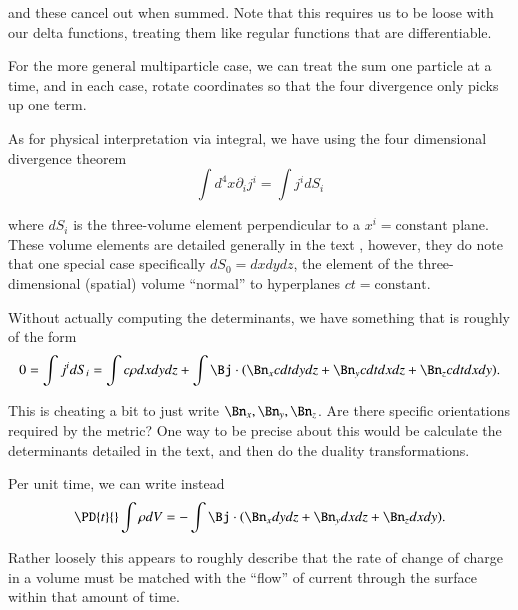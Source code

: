{and these cancel out when summed.  Note that this requires us to be loose with our delta functions, treating them like regular functions that are differentiable.

For the more general multiparticle case, we can treat the sum one particle at a time, and in each case, rotate coordinates so that the four divergence only picks up one term.

As for physical interpretation via integral, we have using the four dimensional divergence theorem
%
\begin{equation}\label{eqn:relElectroDynProblemSet3:2080}
\int d^4 x \partial_i j^i = \int j^i dS_i
\end{equation}

where \(dS_i\) is the three-volume element perpendicular to a \(x^i = \text{constant}\) plane.  These volume elements are detailed generally in the text \citep{landau1980classical}, however, they do note that one special case specifically \(dS_0 = dx dy dz\), the element of the three-dimensional (spatial) volume ``normal'' to hyperplanes \(ct = \text{constant}\).

Without actually computing the determinants, we have something that is roughly of the form
%
\begin{equation}\label{eqn:relElectroDynProblemSet3:2100}
0
= \int j^i dS_i
=
\int c \rho dx dy dz
+\int \Bj \cdot (\Bn_x c dt dy dz + \Bn_y c dt dx dz + \Bn_z c dt dx dy).
\end{equation}

This is cheating a bit to just write \(\Bn_x, \Bn_y, \Bn_z\).  Are there specific orientations required by the metric?  One way to be precise about this would be calculate the determinants detailed in the text, and then do the duality transformations.

Per unit time, we can write instead
\begin{equation}\label{eqn:relElectroDynProblemSet3:2120}
\PD{t}{} \int \rho dV
= -\int \Bj \cdot (\Bn_x dy dz + \Bn_y dx dz + \Bn_z dx dy).
\end{equation}

Rather loosely this appears to roughly describe that the rate of change of charge in a volume must be matched with the ``flow'' of current through the surface within that amount of time.

}

